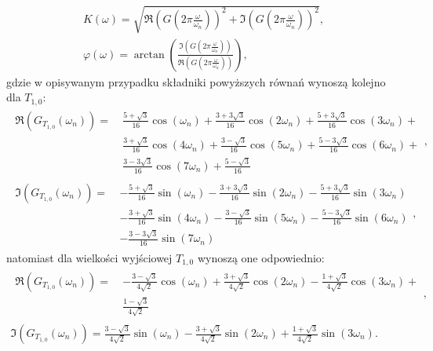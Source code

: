 \begin{gather}
K \left( \omega \right) = \sqrt{\Re \left( G \left( 2\pi \frac{\omega}{\omega_{n}} \right) \right)^{2} + \Im \left( G \left( 2\pi \frac{\omega}{\omega_{n}} \right) \right)^{2}} \label{eqn_sym_partd_output_amp_w}, \\
\varphi \left( \omega \right) = \arctan \left( \frac{\Im \left( G \left( 2\pi \frac{\omega}{\omega_{n}} \right) \right)}{\Re \left( G \left( 2\pi \frac{\omega}{\omega_{n}} \right) \right)} \right) \label{eqn_sym_partd_output_phi_w},
\end{gather}
gdzie w opisywanym przypadku składniki powyższych równań wynoszą kolejno dla $T_{1,0}$:
\begin{gather}
\begin{split}
\Re \left( G_{T_{1,0}} \left( \omega_{n} \right) \right) = ~
& \frac{5 + \sqrt{3}}{16} \cos \left( \omega_{n} \right) + \frac{3 + 3 \sqrt{3}}{16} \cos \left( 2\omega_{n} \right) + \frac{5 + 3 \sqrt{3}}{16} \cos \left( 3\omega_{n} \right) + \\
& \frac{3 + \sqrt{3}}{16} \cos \left( 4\omega_{n} \right) + \frac{3 - \sqrt{3}}{16} \cos \left( 5\omega_{n} \right) + \frac{5 - 3 \sqrt{3}}{16} \cos \left( 6\omega_{n} \right) + \\
& \frac{3 - 3 \sqrt{3}}{16} \cos \left( 7\omega_{n} \right) + \frac{5 - \sqrt{3}}{16}
\end{split}
\label{eqn_sym_partd_output_trans_wn_re_S_2_0}, \\
\begin{split}
\Im \left( G_{T_{1,0}} \left( \omega_{n} \right) \right) = ~
& - \frac{5 + \sqrt{3}}{16} \sin \left( \omega_{n} \right) - \frac{3 + 3 \sqrt{3}}{16} \sin \left( 2\omega_{n} \right) - \frac{5 + 3 \sqrt{3}}{16} \sin \left( 3\omega_{n} \right) \\
& - \frac{3 + \sqrt{3}}{16} \sin \left( 4\omega_{n} \right) - \frac{3 - \sqrt{3}}{16} \sin \left( 5\omega_{n} \right) - \frac{5 - 3 \sqrt{3}}{16} \sin \left( 6\omega_{n} \right) \\
& - \frac{3 - 3 \sqrt{3}}{16} \sin \left( 7\omega_{n} \right)
\end{split}
\label{eqn_sym_partd_output_trans_wn_im_S_2_0},
\end{gather}
natomiast dla wielkości wyjściowej $T_{1,0}$ wynoszą one odpowiednio:
\begin{gather}
\begin{split}
\Re \left( G_{T_{1,0}} \left( \omega_{n} \right) \right) = ~
& - \frac{3 - \sqrt{3}}{4 \sqrt{2}} \cos \left( \omega_{n} \right) + \frac{3 + \sqrt{3}}{4 \sqrt{2}} \cos \left( 2\omega_{n} \right) - \frac{1 + \sqrt{3}}{4 \sqrt{2}} \cos \left( 3\omega_{n} \right) + \\
& \frac{1 - \sqrt{3}}{4 \sqrt{2}}
\end{split}
\label{eqn_sym_partd_output_trans_wn_re_T_1_0}, \\
\Im \left( G_{T_{1,0}} \left( \omega_{n} \right) \right) = \frac{3 - \sqrt{3}}{4 \sqrt{2}} \sin \left( \omega_{n} \right) - \frac{3 + \sqrt{3}}{4 \sqrt{2}} \sin \left( 2\omega_{n} \right) + \frac{1 + \sqrt{3}}{4 \sqrt{2}} \sin \left( 3\omega_{n} \right)
\label{eqn_sym_partd_output_trans_wn_im_T_1_0}.
\end{gather}

